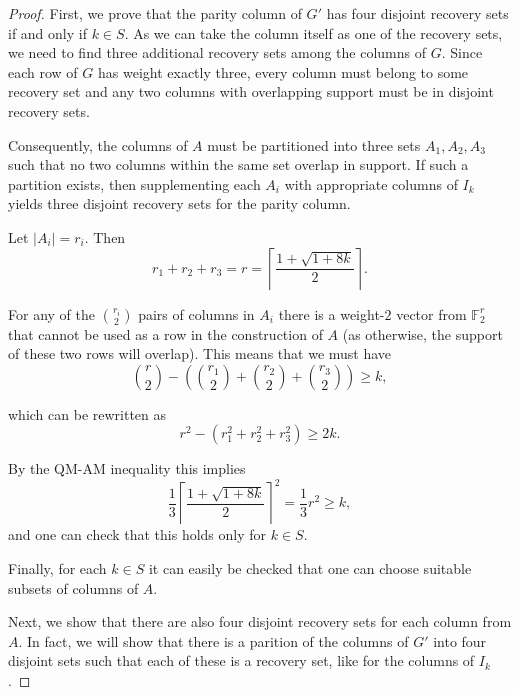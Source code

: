 \documentclass[10pt,a4paper]{amsart}
\newcommand{\F}{\mathbb{F}}
\begin{document}
\begin{proof}
    First, we prove that the parity column of $G'$ has four disjoint recovery sets if and only if $k \in S$. As we can take the column itself as one of the recovery sets, we need to find three additional recovery sets among the columns of $G$. Since each row of $G$ has weight exactly three, every column must belong to some recovery set and any two columns with overlapping support must be in disjoint recovery sets. 
    
    Consequently, the columns of $A$ must be partitioned into three sets $A_1, A_2, A_3$ such that no two columns within the same set overlap in support. If such a partition exists, then supplementing each $A_i$ with appropriate columns of $I_k$ yields three disjoint recovery sets for the parity column.
    
    Let $|A_i| = r_i$. Then
    $$
        r_1 + r_2 + r_3 = r = \left\lceil \frac{1 + \sqrt{1 + 8k}}{2}\right\rceil.
    $$
    
    For any of the $\binom{r_i}{2}$ pairs of columns in $A_i$ there is a weight-$2$ vector from $\F_2^r$ that cannot be used as a row in the construction of $A$ (as otherwise, the support of these two rows will overlap). This means that we must have 
    $$
        \binom{r}{2} - \left( \binom{r_1}{2} + \binom{r_2}{2} + \binom{r_3}{2}\right) \geq k,
    $$

    which can be rewritten as 
    $$
       r^2 - (r_1^2 + r_2^2 + r_3^2) \geq 2k.
    $$

    By the QM-AM inequality this implies 
    $$
        \frac{1}{3} \left\lceil \frac{1 + \sqrt{1 + 8k}}{2}\right\rceil^2 = \frac{1}{3}r^2 \geq k,
    $$
    and one can check that this holds only for $k \in S$. 

    Finally, for each $k \in S$ it can easily be checked that one can choose suitable subsets of columns of $A$.

    Next, we show that there are also four disjoint recovery sets for each column from $A$. In fact, we will show that there is a parition of the columns of $G'$ into four disjoint sets such that each of these is a recovery set, like for the columns of $I_k$. 


\end{proof}
\end{document}
